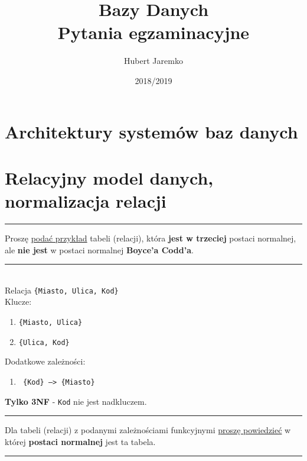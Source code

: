 \documentclass[a5paper,6pt]{article}
\title{%
  Bazy Danych \\
  \large Pytania egzaminacyjne}
\author{Hubert Jaremko}
\date{2018/2019}
\newcommand{\horrule}[1]{\rule{\linewidth}{#1}}
\begin{document}
    \maketitle
    \tableofcontents
    \pagebreak

    \section{Architektury systemów baz danych} %
    \label{sec:architektury_systemow}


    \section{Relacyjny model danych, normalizacja relacji} %
    \label{sec:relacyjny_model_danych_normalizacja_relacji}

    \horrule{0.5pt}
    Proszę \underline{podać przykład} tabeli (relacji), która \textbf{jest w
    trzeciej} postaci normalnej, ale \textbf{nie jest} w postaci normalnej
    \textbf{Boyce’a Codd’a}.\\
    \horrule{0.5pt}\\

    Relacja \texttt{\{Miasto, Ulica, Kod\}}\\
    Klucze:
    \begin{enumerate}
        \item \texttt{\{Miasto, Ulica\}}
        \item \texttt{\{Ulica, Kod\}}
    \end{enumerate}

    Dodatkowe zależności:
    \begin{enumerate}
        \item \texttt{ \{Kod\} --> \{Miasto\}}\\
    \end{enumerate}

    \begin{tcolorbox}
    \textbf{Tylko 3NF} - \texttt{Kod} nie jest nadkluczem.
    \end{tcolorbox}



    \horrule{0.5pt}
    Dla tabeli (relacji) z podanymi zależnościami funkcyjnymi \underline{proszę
     powiedzieć} w której \textbf{postaci normalnej} jest ta tabela.\\
    \horrule{0.5pt}\\
\end{document}
